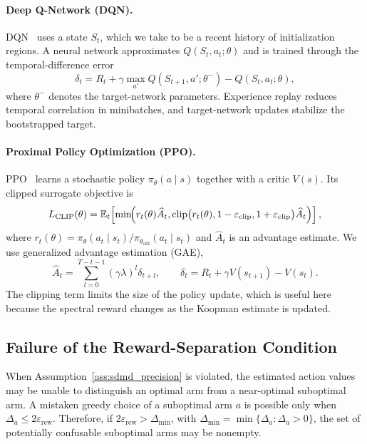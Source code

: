 \documentclass{article}
\numberwithin{equation}{section}
\theoremstyle{definition}
\newcommand{\old}{\text{old}}
\begin{document}
\paragraph{Deep Q-Network (DQN).}
DQN~\cite{mnih2013playing} uses a state $S_t$, which we take to be a recent history of initialization regions. A neural network approximates $Q(S_t,a_t;\theta)$ and is trained through the temporal-difference error
\begin{equation*}
\delta_t=R_t+\gamma\max_{a'}Q(S_{t+1},a';\theta^-)-Q(S_t,a_t;\theta),
\end{equation*}
where $\theta^-$ denotes the target-network parameters. Experience replay reduces temporal correlation in minibatches, and target-network updates stabilize the bootstrapped target.

\paragraph{Proximal Policy Optimization (PPO).}
PPO~\cite{schulman2017proximal} learns a stochastic policy $\pi_\theta(a\mid s)$ together with a critic $V(s)$. Its clipped surrogate objective is
\begin{equation}\label{eq:ppo_clip}
L_{\mathrm{CLIP}}(\theta)
=
\mathbb{E}_t\!\left[
\min\!\Bigl(r_t(\theta)\widehat A_t,
\operatorname{clip}\bigl(r_t(\theta),1-\varepsilon_{\mathrm{clip}},1+\varepsilon_{\mathrm{clip}}\bigr)\widehat A_t\Bigr)
\right],
\end{equation}
where $r_t(\theta)=\pi_\theta(a_t\mid s_t)/\pi_{\theta_{\old}}(a_t\mid s_t)$ and $\widehat A_t$ is an advantage estimate. We use generalized advantage estimation (GAE),
\begin{equation*}
\widehat A_t=\sum_{l=0}^{T-t-1}(\gamma\lambda)^l\delta_{t+l},
\qquad
\delta_t=R_t+\gamma V(s_{t+1})-V(s_t).
\end{equation*}
The clipping term limits the size of the policy update, which is useful here because the spectral reward changes as the Koopman estimate is updated.

\subsection{Failure of the Reward-Separation Condition}\label{app:failure_case_bandit}
When Assumption~\ref{ass:sdmd_precision} is violated, the estimated action values may be unable to distinguish an optimal arm from a near-optimal suboptimal arm. A mistaken greedy choice of a suboptimal arm $a$ is possible only when $\Delta_a\le 2\varepsilon_{\mathrm{rew}}$. Therefore, if $2\varepsilon_{\mathrm{rew}}>\Delta_{\min}$, with $\Delta_{\min}=\min\{\Delta_a:\Delta_a>0\}$, the set of potentially confusable suboptimal arms may be nonempty.
\end{document}
